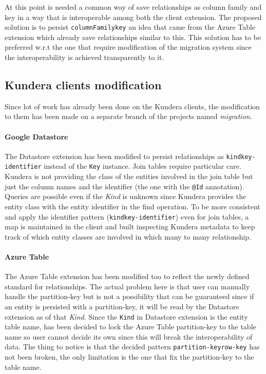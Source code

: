 \noindent At this point is needed a common way of save relationships as column family and key in a way that is interoperable among both the client extension.
The proposed solution is to persist \texttt{columnFamily\textunderscore key} an idea that came from the Azure Table extension which already save relationships similar to this. This solution has to be preferred w.r.t the one that require modification of the migration system since the interoperability is achieved transparently to it.

\subsection{Kundera clients modification}
Since lot of work has already been done on the Kundera clients, the modification to them has been made on a separate branch of the projects named \textit{migration}.

\paragraph{Google Datastore} The Datastore extension has been modified to persist relationships as \texttt{kind\textunderscore key-identifier} instead of the \texttt{Key} instance.
Join tables require particular care. Kundera is not providing the class of the entities involved in the join table but just the column names and the identifier (the one with the \texttt{@Id} annotation). Queries are possible even if the \textit{Kind} is unknown since Kundera provides the entity class with the entity identifier in the find operation.
To be more consistent and apply the identifier pattern (\texttt{kind\textunderscore key-identifier}) even for join tables, a map is maintained in the client and built inspecting Kundera metadata to keep track of which entity classes are involved in which many to many relationship.

\paragraph{Azure Table} The Azure Table extension has been modified too to reflect the newly defined standard for relationships. The actual problem here is that user can manually handle the partition-key but is not a possibility that can be guaranteed since if an entity is persisted with a partition-key, it will be read by the Datastore extension as of that \textit{Kind}.
Since the \texttt{Kind} in Datastore extension is the entity table name, has been decided to lock the Azure Table partition-key to the table name so user cannot decide its own since this will break the interoperability of data.
The thing to notice is that the decided pattern \texttt{partition-key\textunderscore row-key} has not been broken, the only limitation is the one that fix the partition-key to the table name.

